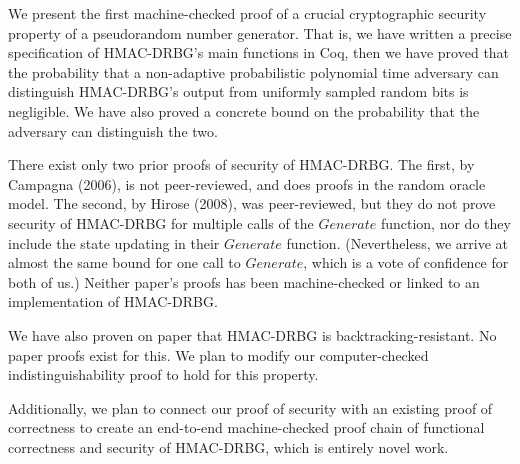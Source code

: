 \documentclass[12pt,lot, lof]{puthesis}
\begin{document}



We present the first machine-checked proof of a crucial cryptographic security property of a pseudorandom number generator. That is, we have written a precise specification of HMAC-DRBG's main functions in Coq, then we have proved that the probability that a non-adaptive probabilistic polynomial time adversary can distinguish HMAC-DRBG's output from uniformly sampled random bits is negligible. We have also proved a concrete bound on the probability that the adversary can distinguish the two. 

There exist only two prior proofs of security of HMAC-DRBG. The first, by Campagna (2006), is not peer-reviewed, and does proofs in the random oracle model. The second, by Hirose (2008), was peer-reviewed, but they do not prove security of HMAC-DRBG for multiple calls of the $Generate$ function, nor do they include the state updating in their $Generate$ function. (Nevertheless, we arrive at almost the same bound for one call to $Generate$, which is a vote of confidence for both of us.) Neither paper's proofs has been machine-checked or linked to an implementation of HMAC-DRBG.

We have also proven on paper that HMAC-DRBG is backtracking-resistant. No paper proofs exist for this. We plan to modify our computer-checked indistinguishability proof to hold for this property.

Additionally, we plan to connect our proof of security with an existing proof of correctness to create an end-to-end machine-checked proof chain of functional correctness and security of HMAC-DRBG, which is entirely novel work.

\end{document}
